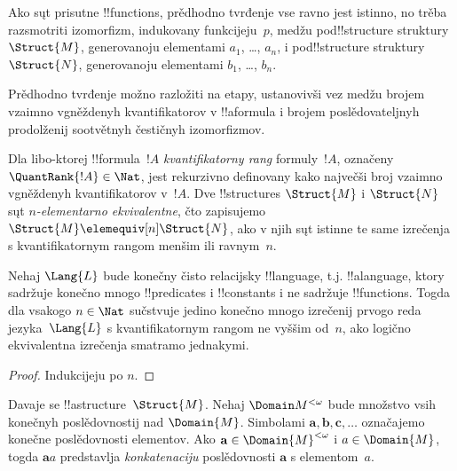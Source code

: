 \documentclass[../../../include/open-logic-section]{subfiles}
\begin{document}
\begin{rem}
Ako sųt prisutne !!{function}s, prědhodno tvrđenje vse ravno jest
istinno, no trěba razsmotriti izomorfizm, indukovany funkcijeju~$p$,
medžu pod!!{structure} struktury $\Struct{M}$, generovanoju elementami
$a_1$, \dots, $a_n$, i pod!!{structure} struktury $\Struct{N}$,
generovanoju elementami $b_1$, \dots, $b_n$.
\end{rem}

Prědhodno tvrđenje možno razložiti na etapy, ustanovivši vez medžu
brojem vzaimno vgněždenyh kvantifikatorov v !!a{formula} i brojem
poslědovateljnyh prodolženij sootvětnyh čestičnyh izomorfizmov.

\begin{defn}
  Dla libo-ktorej !!{formula}~$!A$ \emph{kvantifikatorny rang}
  formuly~$!A$, označeny $\QuantRank{!A} \in \Nat$, jest rekurzivno
  definovany kako največši broj vzaimno vgněždenyh kvantifikatorov
  v~$!A$. Dve !!{structure}s $\Struct{M}$ i $\Struct{N}$ sųt
  \emph{$n$-elementarno ekvivalentne}, čto zapisujemo
  $\Struct{M} \elemequiv[n] \Struct{N}$, ako v njih sųt istinne te same
  izrečenja s kvantifikatornym rangom menšim ili ravnym~$n$.
\end{defn}

\begin{prop}
  Nehaj $\Lang{L}$ bude konečny čisto relacijsky !!{language}, t.j.
  !!a{language}, ktory sadržuje konečno mnogo !!{predicate}s i
  !!{constant}s i ne sadržuje !!{function}s. Togda dla vsakogo
  $n \in \Nat$ sučstvuje jedino konečno mnogo izrečenij prvogo reda
  jezyka~$\Lang{L}$ s kvantifikatornym rangom ne vyššim od~$n$, ako
  logično ekvivalentna izrečenja smatramo jednakymi.
\end{prop}

\begin{proof}
  Indukcijeju po $n$.
\end{proof}

\begin{defn}
  Davaje se !!a{structure}~$\Struct{M}$. Nehaj $\Domain M^{<\omega}$
  bude množstvo vsih konečnyh poslědovnostij nad $\Domain{M}$.
  Simbolami $\mathbf{a},
  \mathbf{b}, \mathbf{c}, \ldots$ označajemo
  konečne poslědovnosti elementov. Ako
  $\mathbf{a} \in \Domain{M}^{<\omega}$ i $a \in \Domain{M}$, togda
  $\mathbf{a}a$ predstavlja \emph{konkatenaciju} poslědovnosti
  $\mathbf{a}$ s elementom~$a$.
\end{defn}
\end{document}
